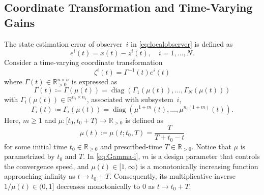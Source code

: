 \documentclass[journal]{IEEEtran}
\newcommand{\diag}{\operatorname{diag}}	%
\begin{document}
\subsection{Coordinate Transformation and Time-Varying Gains}\label{sub:designapproach}
The state estimation error of observer~$i$ in \eqref{eq:localobserver} is defined as 
\[
e^i(t) = x(t) - z^i(t), \quad i=1,\dots,N.
\]
Consider a time-varying coordinate transformation
\[
\zeta^{i}(t) = \Gamma^{-1}(t) e^{i}(t)
\]
where $\Gamma(t)\in\mathbb{R}_{>0}^{n\times n}$ is expressed as
\begin{equation}\label{eq:Gamma}
\Gamma(t) \coloneqq \Gamma(\mu(t)) = \diag\left(
\Gamma_1(\mu(t)),\dots, \Gamma_N(\mu(t))
\right)
\end{equation}
with $\Gamma_i(\mu(t)) \in \mathbb{R}^{n_i \times n_i}$, associated with subsystem~$i$,
\begin{equation} \label{eq:Gamma-i}
    \Gamma_i(t) \coloneqq \Gamma_i(\mu(t)) = \diag\left(
     \mu^{1+m}(t),\ldots,\mu^{n_i(1+m)}(t)
     \right).
\end{equation}
Here, $m\geq 1$ and $\mu:[t_0,t_0+T) \to \mathbb R_{>0}$ is defined as
\begin{equation}\label{eq:mu}
        \mu(t)\coloneqq\mu(t;t_0,T)= \frac{T}{T+t_0-t}
\end{equation}
for some initial time $t_0\in\mathbb R_{\geq 0}$ and prescribed-time $T\in\mathbb R_{>0}$. Notice that $\mu$ is parametrized by $t_0$ and $T$.
In \eqref{eq:Gamma-i}, $m$ is a design parameter that controls the convergence speed, and $\mu(t)\in[1,\infty)$ is a monotonically increasing function approaching infinity as $t\to t_0 + T$. Consequently, its multiplicative inverse $1/\mu(t)\in(0,1]$ decreases monotonically to $0$ as $t\to t_0+T$. 
\end{document}
